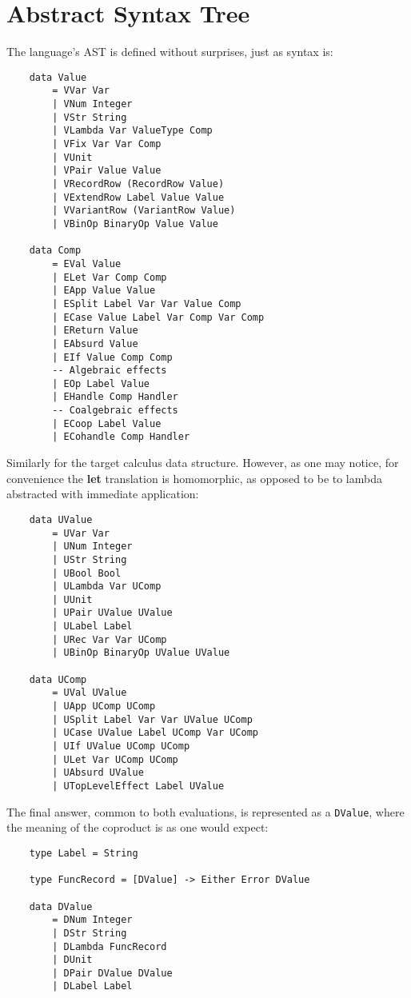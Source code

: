 \documentclass[declaration,shortabstract]{iithesis}
\theoremstyle{definition} \newtheorem{definition}{Definition}[chapter]
\theoremstyle{remark} \newtheorem{remark}[definition]{Observation}
\theoremstyle{plain} \newtheorem{theorem}[definition]{Theorem}
\theoremstyle{plain} \newtheorem{lemma}[definition]{Lemma}
\begin{document}
    \section{Abstract Syntax Tree}\label{sec:implementation-ast}

    The language's AST is defined without surprises, just as syntax is:

\begin{verbatim}
    data Value
        = VVar Var
        | VNum Integer
        | VStr String
        | VLambda Var ValueType Comp
        | VFix Var Var Comp
        | VUnit
        | VPair Value Value
        | VRecordRow (RecordRow Value)
        | VExtendRow Label Value Value
        | VVariantRow (VariantRow Value)
        | VBinOp BinaryOp Value Value

    data Comp
        = EVal Value
        | ELet Var Comp Comp
        | EApp Value Value
        | ESplit Label Var Var Value Comp
        | ECase Value Label Var Comp Var Comp
        | EReturn Value
        | EAbsurd Value
        | EIf Value Comp Comp
        -- Algebraic effects
        | EOp Label Value
        | EHandle Comp Handler
        -- Coalgebraic effects
        | ECoop Label Value
        | ECohandle Comp Handler
\end{verbatim}

    \noindent
    Similarly for the target calculus data structure. However, as one may notice,
    for convenience the \textbf{let} translation is homomorphic, as opposed to be
    to lambda abstracted with immediate application:

\begin{verbatim}
    data UValue
        = UVar Var
        | UNum Integer
        | UStr String
        | UBool Bool
        | ULambda Var UComp
        | UUnit
        | UPair UValue UValue
        | ULabel Label
        | URec Var Var UComp
        | UBinOp BinaryOp UValue UValue

    data UComp
        = UVal UValue
        | UApp UComp UComp
        | USplit Label Var Var UValue UComp
        | UCase UValue Label UComp Var UComp
        | UIf UValue UComp UComp
        | ULet Var UComp UComp
        | UAbsurd UValue
        | UTopLevelEffect Label UValue
\end{verbatim}

    \noindent
    The final answer, common to both evaluations, is represented as a \verb!DValue!,
    where the meaning of the coproduct is as one would expect:

\begin{verbatim}
    type Label = String

    type FuncRecord = [DValue] -> Either Error DValue

    data DValue
        = DNum Integer
        | DStr String
        | DLambda FuncRecord
        | DUnit
        | DPair DValue DValue
        | DLabel Label
\end{verbatim}
\end{document}
